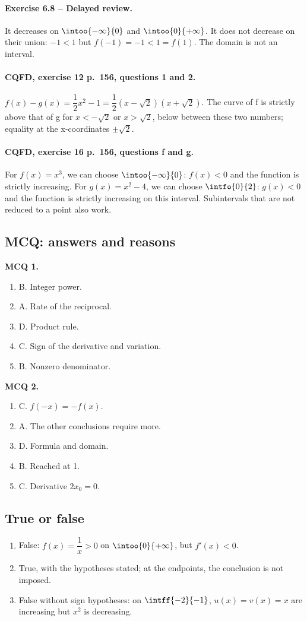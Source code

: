 \paragraph{Exercise 6.8 -- Delayed review.} It decreases on $\intoo{-\infty}{0}$ and $\intoo{0}{+\infty}$. It does not decrease on their union: $-1<1$ but $f(-1)=-1<1=f(1)$. The domain is not an interval.
\paragraph{CQFD, exercise 12 p.~156, questions 1 and 2.} $f(x)-g(x)=\dfrac12x^2-1=\dfrac12(x-\sqrt2)(x+\sqrt2)$. The curve of f is strictly above that of g for $x<-\sqrt2$ or $x>\sqrt2$, below between these two numbers; equality at the x-coordinates $\pm\sqrt2$.
\paragraph{CQFD, exercise 16 p.~156, questions f and g.} For $f(x)=x^3$, we can choose $\intoo{-\infty}{0}$: $f(x)<0$ and the function is strictly increasing. For $g(x)=x^2-4$, we can choose $\intfo{0}{2}$: $g(x)<0$ and the function is strictly increasing on this interval. Subintervals that are not reduced to a point also work.
\subsection*{MCQ: answers and reasons}
\textbf{MCQ 1.}
\begin{enumerate}
\item B. Integer power.
\item A. Rate of the reciprocal.
\item D. Product rule.
\item C. Sign of the derivative and variation.
\item B. Nonzero denominator.
\end{enumerate}
\textbf{MCQ 2.}
\begin{enumerate}
\item C. $f(-x)=-f(x)$.
\item A. The other conclusions require more.
\item D. Formula and domain.
\item B. Reached at 1.
\item C. Derivative $2x_0=0$.
\end{enumerate}
\subsection*{True or false}
\begin{enumerate}
\item False: $f(x)=\dfrac{1}{x}>0$ on $\intoo{0}{+\infty}$, but $f\prime(x)<0$.
\item True, with the hypotheses stated; at the endpoints, the conclusion is not imposed.
\item False without sign hypotheses: on $\intff{-2}{-1}$, $u(x)=v(x)=x$ are increasing but $x^2$ is decreasing.
\end{enumerate}
